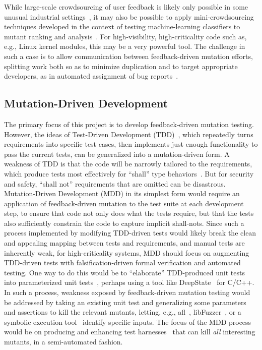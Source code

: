 While large-scale crowdsourcing of user feedback is likely only
possible in some unusual industrial
settings~\cite{MutGoogle,ivankovic2018industrial}, it may also be
possible to apply mini-crowdsourcing techniques developed in the
context of testing machine-learning classifiers to mutant ranking and
analysis~\cite{Minicrowd}.  For high-visibility, high-criticality code
such as, e.g., Linux kernel modules, this may be a very powerful
tool.  The challenge in such a case is to allow communication between
feedback-driven mutation efforts, splitting work both so as to
minimize duplication and to target appropriate developers, as in automated assignment of
bug reports~\cite{bhattacharya2012automated,jonsson2016automated}.


\subsection{Mutation-Driven Development}

The primary focus of this project is to develop feedback-driven mutation
testing.  However, the ideas of Test-Driven Development
(TDD)~\cite{TDD,TDDFuture}, which repeatedly turns requirements into specific
test cases, then implements just enough functionality to pass the current tests,
can be generalized into a mutation-driven form.  A weakness of TDD is that the code will be narrowly tailored to the
requirements, which produce tests most effectively for ``shall''
type behaviors~\cite{INCOSE}.  But for security and
safety, ``shall not'' requirements that are omitted can be disastrous.
Mutation-Driven Development (MDD) in its simplest form would require an
application of feedback-driven mutation to the test suite at each development
step, to ensure that code not only does what the tests require, but that the
tests also sufficiently constrain the code to capture implicit shall-nots.
Since such a process implemented by modifying TDD-driven tests would likely
break the clean and appealing mapping between tests and requirements, and manual
tests are inherently weak, for high-criticality systems, MDD should focus on
augmenting TDD-driven tests with falsification-driven formal verification and
automated testing.  One way to do this would be to ``elaborate'' TDD-produced
unit tests into parameterized unit tests~\cite{UnitMeister,ParamUnit}, perhaps
using a tool like DeepState~\cite{DeepState} for C/C++.  In such a process,
weakness exposed by feedback-driven mutation testing would be addressed by
taking an existing unit test and generalizing some parameters and assertions to
kill the relevant mutants, letting, e.g., afl~\cite{aflfuzz},
libFuzzer~\cite{libfuzzer}, or a symbolic execution
tool~\cite{angr1,angr2,manticore} identify specific inputs.  The focus of the
MDD process would be on producing and enhancing test harnesses~\cite{WODACommon,tstlsttt} that
can kill \emph{all} interesting mutants, in a semi-automated fashion.

